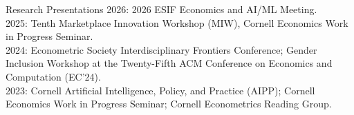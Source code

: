 \documentclass{resume} %
\newcommand{\itab}[1]{\hspace{0em}\rlap{#1}}
\begin{document}










\begin{rSection}{Research Presentations}
2026: 2026 ESIF Economics and AI/ML Meeting. \\
2025: Tenth Marketplace Innovation Workshop (MIW), Cornell Economics Work in Progress Seminar. \\
2024: Econometric Society Interdisciplinary Frontiers Conference; Gender Inclusion Workshop at the Twenty-Fifth ACM Conference on Economics and Computation (EC'24). \\
2023: Cornell Artificial Intelligence, Policy, and Practice (AIPP); Cornell Economics Work in Progress Seminar; Cornell Econometrics Reading Group. 
\end{rSection}
\end{document}
